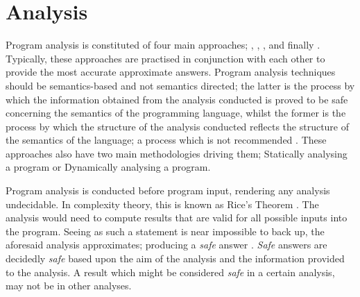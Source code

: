 	
	\section{Analysis}
	\par Program analysis is constituted of four main approaches; , , , and finally  \cite[pp.1--2]{nielson2004principlesofPA}. Typically, these approaches are practised in conjunction with each other to provide the most accurate approximate answers.
	Program analysis techniques should be semantics-based and not semantics directed; the latter is the process by which the information obtained from the analysis conducted is proved
	to be safe concerning the semantics of the programming language, whilst the former is the process by which the structure of the analysis conducted reflects the structure of the semantics of the language; a process which is 
	not recommended \cite[pp.2--3]{nielson2004principlesofPA}. These approaches also have two main methodologies driving them; Statically analysing a program or Dynamically analysing a program.
	\par Program analysis is conducted before program input, rendering any analysis undecidable. In complexity theory, this is known as Rice's Theorem \cite[]{rice1953classes}. The analysis would need to compute results that are valid for 
	all possible inputs into the program. Seeing as such a statement is near impossible to back up, the aforesaid analysis approximates; producing a \textit{safe} answer \cite[pp.9--11]{andersen1994program}. \textit{Safe} answers are decidedly
	\textit{safe} based upon the aim of the analysis and the information provided to the analysis. A result which might be considered \textit{safe} in a certain analysis, may not be in other analyses.

	
